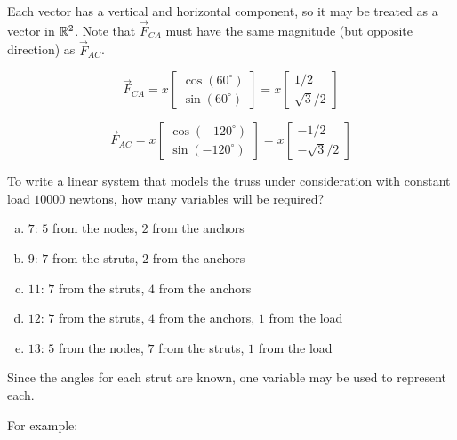 \begin{applicationActivities}
\begin{observation}
\drawtruss{}

Each vector has a vertical and horizontal component,
so it may be treated as a vector in \(\mathbb{R}^2\).
Note that \(\vec F_{CA}\) must have the same magnitude (but opposite
direction) as \(\vec F_{AC}\).

\[
  \vec{F}_{CA}
    = 
  x\begin{bmatrix} \cos(60^\circ) \\ \sin(60^\circ) \end{bmatrix}
    =
  x\begin{bmatrix} 1/2 \\ \sqrt{3}/2\end{bmatrix}
\]

\[
  \vec{F}_{AC}
    = 
  x\begin{bmatrix} \cos(-120^\circ) \\ \sin(-120^\circ) \end{bmatrix}
    =
  x\begin{bmatrix} -1/2 \\ -\sqrt{3}/2\end{bmatrix}
\]
\end{observation}

\begin{activity}{5}
To write a linear system that models the truss under consideration
with constant load \(10000\) newtons,
how many variables will be required?

\drawtruss{}

\begin{enumerate}[a)]
\item \(7\): \(5\) from the nodes, \(2\) from the anchors
\item \(9\): \(7\) from the struts, \(2\) from the anchors
\item \(11\): \(7\) from the struts, \(4\) from the anchors
\item \(12\): \(7\) from the struts, \(4\) from the anchors, \(1\) from the load
\item \(13\): \(5\) from the nodes, \(7\) from the struts, \(1\) from the load
\end{enumerate}
\end{activity}

\begin{observation}
Since the angles for each strut are known,
one variable may be used to represent each.

\drawtruss{\trussStrutVariables}

For example:


\end{observation}
\end{applicationActivities}
